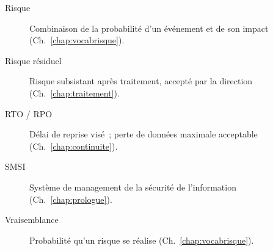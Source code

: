 \begin{description}
    \item[Risque] Combinaison de la probabilité d'un événement et de son impact (Ch.~\ref{chap:vocabrisque}).
    \item[Risque résiduel] Risque subsistant après traitement, accepté par la direction (Ch.~\ref{chap:traitement}).
    \item[RTO / RPO] Délai de reprise visé~; perte de données maximale acceptable (Ch.~\ref{chap:continuite}).
    \item[SMSI] Système de management de la sécurité de l'information (Ch.~\ref{chap:prologue}).
    \item[Vraisemblance] Probabilité qu'un risque se réalise (Ch.~\ref{chap:vocabrisque}).
\end{description}

